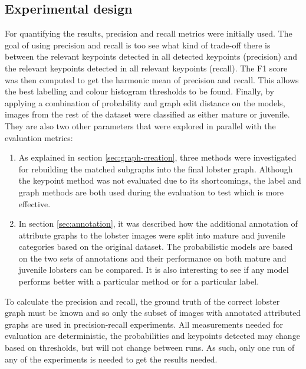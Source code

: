\subsection{Experimental design}
For quantifying the results, precision and recall metrics were initially used. The goal of using precision and recall is too see what kind of trade-off there is between the relevant keypoints detected in all detected keypoints (precision) and the relevant keypoints detected in all relevant keypoints (recall). The F1 score was then computed to get the harmonic mean of precision and recall. This allows the best labelling and colour histogram thresholds to be found. Finally, by applying a combination of probability and graph edit distance on the models, images from the rest of the dataset were classified as either mature or juvenile.
\n
They are also two other parameters that were explored in parallel with the evaluation metrics:
\begin{enumerate}
\item As explained in section \ref{sec:graph-creation}, three methods were investigated for rebuilding the matched subgraphs into the final lobster graph. Although the keypoint method was not evaluated due to its shortcomings, the label and graph methods are both used during the evaluation to test which is more effective.
\item In section \ref{sec:annotation}, it was described how the additional annotation of attribute graphs to the lobster images were split into mature and juvenile categories based on the original dataset. The probabilistic models are based on the two sets of annotations and their performance on both mature and juvenile lobsters can be compared. It is also interesting to see if any model performs better with a particular method or for a particular label. 
\end{enumerate}
To calculate the precision and recall, the ground truth of the correct lobster graph must be known and so only the subset of images with annotated attributed graphs are used in precision-recall experiments. 
\n
All measurements needed for evaluation are deterministic, the probabilities and keypoints detected may change based on thresholds, but will not change between runs. As such, only one run of any of the experiments is needed to get the results needed.

